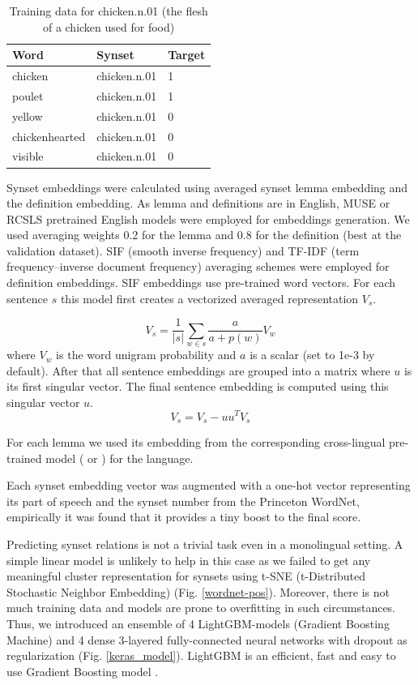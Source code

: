 \documentclass[11pt,a4paper]{article}
\begin{document}
	\begin{table}[!htbp]
	\small
	\caption{Training data for chicken.n.01 (the flesh of a chicken used for food)}
	\label{wordnet-training-data}		
	\centering
	\begin{tabular}{|l|l|l|}
		\hline
		Word & Synset & Target
		\\
		\hline
		chicken & chicken.n.01 & 1
		\\
		poulet & chicken.n.01 & 1
		\\
		yellow & chicken.n.01 & 0
		\\
		chickenhearted & chicken.n.01 & 0
		\\
		visible & chicken.n.01 & 0
		\\
		\hline
	\end{tabular}
	
\end{table}

Synset embeddings were calculated using averaged synset lemma embedding and the definition embedding. As lemma and definitions are in English, MUSE or RCSLS pretrained English models were employed for embeddings generation. We used averaging weights 0.2 for the lemma and 0.8 for the definition (best at the validation dataset). SIF (smooth inverse frequency) and TF-IDF (term frequency–inverse document frequency) averaging schemes were employed for definition embeddings. SIF \cite{Arora2017} embeddings use pre-trained word vectors. For each sentence $s$ this model first creates a vectorized averaged representation $V_s$.

$$V_s = \dfrac{1}{|s|}\sum_{w \in s} \frac{a}{a + p(w)}V_w$$
where $V_w$ is the word unigram probability and $a$ is a scalar (set to 1e-3 by default).
After that all sentence embeddings are grouped into a matrix where $u$ is its first singular vector. The final sentence embedding is computed using this singular vector $u$.
$$V_s = V_s - uu^TV_s$$


For each lemma we used its embedding from the corresponding cross-lingual pre-trained model (\cite{muse} or \cite{joulin2018loss}) for the language.

Each synset embedding vector was augmented with a one-hot vector representing its part of speech and the synset number from the Princeton WordNet, empirically it was found that it provides a tiny boost to the final score.

Predicting synset relations is not a trivial task even in a monolingual setting. A simple linear model is unlikely to help in this case as we failed to get any meaningful cluster representation for synsets using t-SNE (t-Distributed Stochastic Neighbor Embedding) \cite{tsne} (Fig. \ref{wordnet-pos}). Moreover, there is not much training data and models are prone to overfitting in such circumstances. Thus, we introduced an ensemble of 4 LightGBM-models (Gradient Boosting Machine) \cite{lgbm} and 4 dense 3-layered fully-connected neural networks with dropout as regularization \cite{dropout} (Fig. \ref{keras_model}). LightGBM is an efficient, fast and easy to use Gradient Boosting model \cite{natekin2013gradient}.
\end{document}
